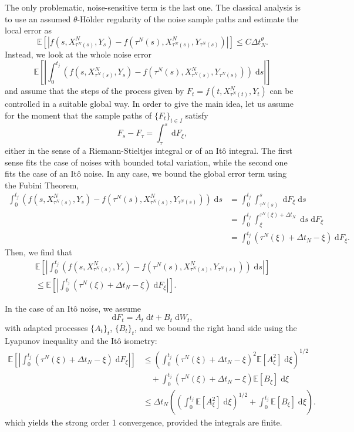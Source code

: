 \documentclass[reqno,12pt]{amsart}
\theoremstyle{plain}%
\theoremstyle{definition}
\begin{document}
The only problematic, noise-sensitive term is the last one. The classical analysis is to use an assumed $\theta$-H\"older regularity of the noise sample paths and estimate the local error as
\[
    \mathbb{E}\left[\left|f(s, X_{\tau^N(s)}^N, Y_s) - f(\tau^N(s), X_{\tau^N(s)}^N, Y_{\tau^N(s)})\right|\right] \leq C\Delta t_N^{\theta}.
\]
Instead, we look at the whole noise error 
\[
    \mathbb{E}\left[\left|\int_0^{t_j} \left( f(s, X_{\tau^N(s)}^N, Y_s) - f(\tau^N(s), X_{\tau^N(s)}^N, Y_{\tau^N(s)}) \right)\;\mathrm{d}s\right|\right]
\]
and assume that the steps of the process given by $F_t = f(t, X_{\tau^N(t)}^N, Y_t)$ can be controlled in a suitable global way. In order to give the main idea, let us assume for the moment that the sample paths of $\{F_t\}_{t\in I}$ satisfy
\[
    F_s - F_\tau = \int_\tau^s \;\mathrm{d}F_\xi,
\]
either in the sense of a Riemann-Stieltjes integral or of an It\^o integral. The first sense fits the case of noises with bounded total variation, while the second one fits the case of an It\^o noise. In any case, we bound the global error term using the Fubini Theorem,
\begin{align*}
    \int_0^{t_j} \left( f(s, X_{\tau^N(s)}^N, Y_s) - f(\tau^N(s), X_{\tau^N(s)}^N, Y_{\tau^N(s)}) \right)\;\mathrm{d}s & = \int_0^{t_j} \int_{\tau^N(s)}^s \;\mathrm{d}  F_\xi\;\mathrm{d}s \\
    & = \int_0^{t_j} \int_{\xi}^{\tau^N(\xi) + \Delta t_N} \;\mathrm{d}s \;\mathrm{d} F_\xi \\
    & = \int_0^{t_j} (\tau^N(\xi) + \Delta t_N - \xi) \;\mathrm{d} F_\xi.
\end{align*}
Then, we find that
\begin{multline*}
    \mathbb{E}\left[\left| \int_0^{t_j} \left( f(s, X_{\tau^N(s)}^N, Y_s) - f(\tau^N(s), X_{\tau^N(s)}^N, Y_{\tau^N(s)}) \right)\;\mathrm{d}s\right|\right] \\
    \leq \mathbb{E}\left[\left| \int_0^{t_j} (\tau^N(\xi) + \Delta t_N - \xi) \;\mathrm{d} F_\xi \right|\right].
\end{multline*}

In the case of an It\^o noise, we assume
\[
    \mathrm{d}F_t = A_t\;\mathrm{d}t + B_t\;\mathrm{d}W_t,
\]
with adapted processes $\{A_t\}_t$, $\{B_t\}_t$, and we bound the right hand side using the Lyapunov inequality and the It\^o isometry:
\begin{align*}
    \mathbb{E}\left[\left| \int_0^{t_j} (\tau^N(\xi) + \Delta t_N - \xi) \;\mathrm{d} F_\xi \right|\right] & \leq \left( \int_0^{t_j} (\tau^N(\xi) + \Delta t_N - \xi)^2 \mathbb{E}[A_\xi^2]\;\mathrm{d} \xi\right)^{1/2} \\ 
    & \quad + \int_0^{t_j} (\tau^N(\xi) + \Delta t_N - \xi) \mathbb{E}[B_\xi] \;\mathrm{d}\xi  \\ 
    & \leq \Delta t_N\left(\left( \int_0^{t_j} \mathbb{E}[A_\xi^2]\;\mathrm{d} \xi \right)^{1/2} + \int_0^{t_j} \mathbb{E}[B_\xi] \;\mathrm{d}\xi \right).
\end{align*}
which yields the strong order 1 convergence, provided the integrals are finite.
\end{document}
